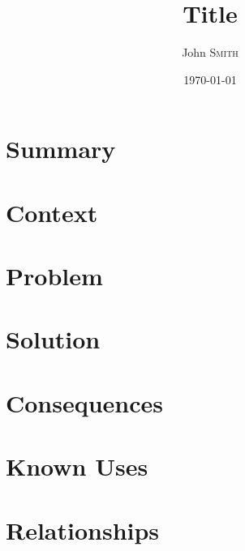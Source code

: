 \documentclass{article}
\title{Title} %
\author{John \textsc{Smith}} %
\date{\today} %
\begin{document}
\maketitle %


\section{Summary}

\section{Context}

\section{Problem}

\section{Solution}

\section{Consequences}

\section{Known Uses}

\section{Relationships}




\end{document}
